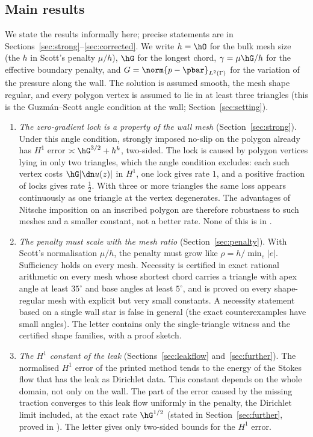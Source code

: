 \subsection{Main results}
We state the results informally here; precise statements are in Sections~\ref{sec:strong}--\ref{sec:corrected}. We write $h=\hO$ for the bulk mesh size (the $h$ in Scott's penalty $\mu/h$), $\hG$ for the longest chord, $\gamma=\mu\hG/h$ for the effective boundary penalty, and $G=\norm{p-\pbar}_{L^2(\Gamma)}$ for the variation of the pressure along the wall. The solution is assumed smooth, the mesh shape regular, and every polygon vertex is assumed to lie in at least three triangles (this is the Guzm\'an--Scott angle condition at the wall; Section~\ref{sec:setting}).
\begin{enumerate}[label=(\arabic*)]
\item \emph{The zero-gradient lock is a property of the wall mesh} (Section~\ref{sec:strong}). Under this angle condition, strongly imposed no-slip on the polygon already has $H^1$ error $\asymp\hG^{3/2}+h^k$, two-sided. The lock is caused by polygon vertices lying in only two triangles, which the angle condition excludes: each such vertex costs $\hG|\dn u(z)|$ in $H^1$, one lock gives rate $1$, and a positive fraction of locks gives rate $\frac12$. With three or more triangles the same loss appears continuously as one triangle at the vertex degenerates. The advantages of Nitsche imposition on an inscribed polygon are therefore robustness to such meshes and a smaller constant, not a better rate. None of this is in \cite{CavalcantePadhiLetter}.
\item \emph{The penalty must scale with the mesh ratio} (Section~\ref{sec:penalty}). With Scott's normalisation $\mu/h$, the penalty must grow like $\rho=h/\min_e|e|$. Sufficiency holds on every mesh. Necessity is certified in exact rational arithmetic on every mesh whose shortest chord carries a triangle with apex angle at least $35^\circ$ and base angles at least $5^\circ$, and is proved on every shape-regular mesh with explicit but very small constants. A necessity statement based on a single wall star is false in general (the exact counterexamples have small angles). The letter \cite{CavalcantePadhiLetter} contains only the single-triangle witness and the certified shape families, with a proof sketch.
\item \emph{The $H^1$ constant of the leak} (Sections~\ref{sec:leakflow} and~\ref{sec:further}). The normalised $H^1$ error of the printed method tends to the energy of the Stokes flow that has the leak as Dirichlet data. This constant depends on the whole domain, not only on the wall. The part of the error caused by the missing traction converges to this leak flow uniformly in the penalty, the Dirichlet limit included, at the exact rate $\hG^{1/2}$ (stated in Section~\ref{sec:further}, proved in \cite{PadhiExt}). The letter gives only two-sided bounds for the $H^1$ error.

\end{enumerate}
